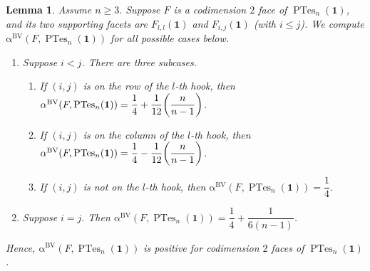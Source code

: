 \documentclass[12pt]{amsart}
\numberwithin{equation}{section}
\newtheorem{lem}[thm]{Lemma}
\theoremstyle{definition}
\def\ptes{\operatorname{PTes}}
\def\1{{\boldsymbol{1}}}
\def\bvalpha{\operatorname{\alpha^{BV}}}
\begin{document}
\begin{lem} \label{alphacd2} Assume $n \ge 3.$
Suppose $F$ is a codimension $2$ face of $\ptes_{n}(\boldsymbol{1})$, and its two supporting facets are $F_{l,l}(\1)$ and $F_{i,j}(\1)$ (with $i \le j$). We compute $\bvalpha(F,\ptes_{n}(\boldsymbol{1}))$ for all possible cases below.
\begin{enumerate}[leftmargin=*, label={\rm (\arabic*)}]
	\item Suppose $i <j$. There are three subcases.   
        \begin{enumerate}[label={\rm (\roman*)}]
            \item If $(i,j)$ is on the row of the $l$-th hook, then $\bvalpha(F,\ptes_{n}(\boldsymbol{1}))=\dfrac{1}{4}+\dfrac{1}{12}\biggl{(}\dfrac{n}{n-1}\biggl{)}$.
            \item If $(i,j)$ is on the column of the $l$-th hook, then $\bvalpha(F,\ptes_{n}(\boldsymbol{1}))=\dfrac{1}{4}-\dfrac{1}{12}\biggl{(}\dfrac{n}{n-1}\biggl{)}$.
            \item If $(i,j)$ is not on the $l$-th hook, then $\bvalpha(F,\ptes_{n}(\boldsymbol{1}))=\dfrac{1}{4}$.
        \end{enumerate}
    \item Suppose $i=j.$ Then $\bvalpha(F,\ptes_{n}(\boldsymbol{1}))=\dfrac{1}{4}+\dfrac{1}{6(n-1)}$.
\end{enumerate}
Hence, $\bvalpha(F,\ptes_{n}(\boldsymbol{1}))$ is positive for codimension $2$ faces of $\ptes_n(\1)$.
\end{lem}
\end{document}
